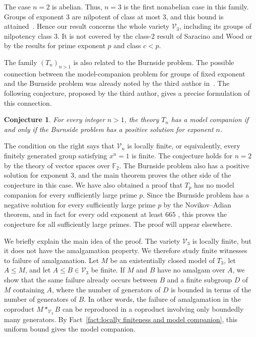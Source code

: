 \documentclass[11pt,reqno]{article}
\newtheorem{conjecture}[theorem]{Conjecture}
\theoremstyle{definition}
\theoremstyle{remark}
\begin{document}
The case $n=2$ is abelian.
Thus, $n=3$ is the first nonabelian case in this family.
Groups of exponent $3$ are nilpotent of class at most $3$, and this bound is attained~\cite{LeviVanDerWaerden1933}.
Hence our result concerns the whole variety $\mathcal V_3$, including its groups of nilpotency class $3$.
It is not covered by the class-$2$ result of Saracino and Wood or by the results for prime exponent $p$ and class $c<p$.

The family $(T_n)_{n>1}$ is also related to the Burnside problem.
The possible connection between the model-companion problem for groups of fixed exponent and the Burnside problem was already noted by the third author in~\cite{Takeuchi2022}.
The following conjecture, proposed by the third author, gives a precise formulation of this connection.

\begin{conjecture}\label{conj:burnside-model-companion}
For every integer $n>1$, the theory $T_n$ has a model companion if and only if the Burnside problem has a positive solution for exponent $n$.
\end{conjecture}

The condition on the right says that $\mathcal V_n$ is locally finite, or equivalently, every finitely generated group satisfying $x^n=1$ is finite.
The conjecture holds for $n=2$ by the theory of vector spaces over $\mathbb F_2$.
The Burnside problem also has a positive solution for exponent $3$, and the main theorem proves the other side of the conjecture in this case.
We have also obtained a proof that $T_p$ has no model companion for
every sufficiently large prime $p$.
Since the Burnside problem has a negative solution for every
sufficiently large prime $p$ by the Novikov--Adian theorem, and in fact for every odd exponent at least
$665$
\cite{NovikovAdian1968,Adian1979}, this proves the conjecture for all
sufficiently large primes.
The proof will appear elsewhere.


We briefly explain the main idea of the proof.
The variety $\mathcal V_3$ is locally finite, but it does not have the amalgamation property.
We therefore study finite witnesses to failure of amalgamation.
Let $M$ be an existentially closed model of $T_3$, let $A\leq M$, and let $A\leq B\in\mathcal V_3$ be finite.
If $M$ and $B$ have no amalgam over $A$, we show that the same failure already occurs between $B$ and a finite subgroup $D$ of $M$ containing $A$, where the number of generators of $D$ is bounded in terms of the number of generators of $B$.
In other words, the failure of amalgamation in the coproduct $M*_{\mathcal V_3}B$ can be reproduced in a coproduct involving only boundedly many generators.
By Fact~\ref{fact:locally finiteness and model companion}, this uniform bound gives the model companion.
\end{document}
